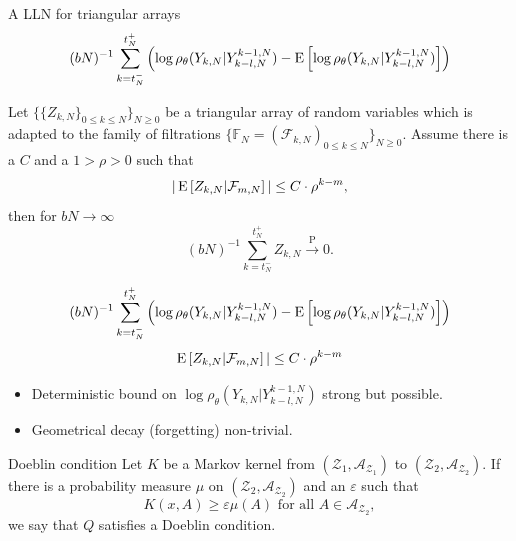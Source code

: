 \begin{frame}{A LLN for triangular arrays}
	\small \[(bN)^{-1} \sum_{k=t_N^-}^{t_N^+} \left(\log \rho_\theta(Y_{k,N}|Y_{k-l,N}^{k-1,N})-  \E[\log \rho_\theta(Y_{k,N}|Y_{k-l,N}^{k-1,N})]\right)\]
	\normalsize
	\begin{propositionblock}
	Let $\{\{Z_{k,N}\}_{0 \leq k \leq N}\}_{N \geq 0}$ be a triangular array of random variables which is adapted to the family of filtrations $\{\mathbb{F}_N = (\mathcal{F}_{k,N})_{0 \leq k \leq N}\}_{N \geq 0}$. Assume there is a $C$ and a $1 > \rho > 0$ such that \[
	|\E[Z_{k,N}|\mathcal{F}_{m,N}]| \leq C \cdot \rho^{k-m},
	\] 
	then for $bN \to \infty$ \[
	(bN)^{-1} \sum_{k=t_N^-}^{t_N^+} Z_{k,N} \overset{\operatorname{P}}{\longrightarrow} 0.
	\]
	\end{propositionblock}
\end{frame}
\begin{frame}
	\small \[(bN)^{-1} \sum_{k=t_N^-}^{t_N^+} \left(\log \rho_\theta(Y_{k,N}|Y_{k-l,N}^{k-1,N})-  \E[\log \rho_\theta(Y_{k,N}|Y_{k-l,N}^{k-1,N})]\right)\]
	\[
	\E[Z_{k,N}|\mathcal{F}_{m,N}]| \leq C \cdot \rho^{k-m}
	\]\pause
	\normalsize
	\begin{itemize}
		\item Deterministic bound on $\log \rho_\theta(Y_{k,N} | Y_{k-l,N}^{k-1,N})$ strong but possible. 
		\item Geometrical decay (forgetting) non-trivial. 
	\end{itemize}
	\pause
	\begin{definitionblockname}{Doeblin condition}
		Let $K$ be a Markov kernel from $(\mathcal{Z}_1, \mathcal{A}_{\mathcal{Z}_1})$ to $(\mathcal{Z}_2, \mathcal{A}_{\mathcal{Z}_2})$. If there is a probability measure $\mu$ on $(\mathcal{Z}_2, \mathcal{A}_{\mathcal{Z}_2})$ and an $\varepsilon$ such that \[
		K(x,A) \geq \varepsilon \mu(A) \text{ for all } A \in \mathcal{A}_{\mathcal{Z}_2},
		\] we say that $Q$ satisfies a Doeblin condition. 
	\end{definitionblockname}
\end{frame}

